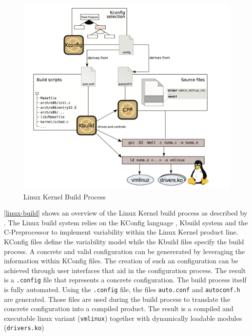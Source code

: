 \documentclass[a4paper]{article}
\begin{document}
\begin{figure}[h] 
  \centering
  \begin{minipage}[b]{1\textwidth} 
    \caption[Linux build process]{Linux Kernel Build Process \cite{Dietrich:2012:RAV:2362536.2362544}}\label{linux-build}
    \includegraphics[width=1\textwidth]{img/linux-build2.png}
  \end{minipage}
\end{figure}

\autoref{linux-build} shows an overview of the Linux Kernel build process as described by \cite{Dietrich:2012:RAV:2362536.2362544}. The Linux build system relies on the KConfig language \cite{kconfig-language.txt}, Kbuild system \cite{makefiles.txt} and the C-Preprocessor to implement variability within the Linux Kernel product line. KConfig files  define the variability model while the Kbuild files specify the build process. A concrete and valid configuration can be genererated by leveraging the information within KConfig files. The creation of such an configuration can be achieved through user interfaces that aid in the configuration process. The result is a \texttt{.config} file that represents a concrete configuration. The build process itself is fully automated. Using the \texttt{.config} file, the files \texttt{auto.conf} and \texttt{autoconf.h} are generated. Those files are used during the build process to translate the concrete configuration into a compiled product. The result is a compiled and executable linux variant (\texttt{vmlinux}) together with dynamically loadable modules (\texttt{drivers.ko})
\end{document}
